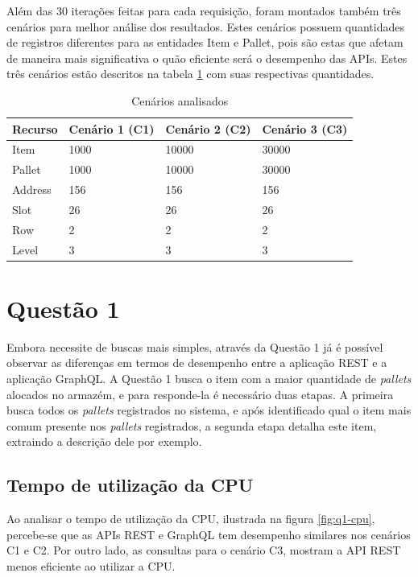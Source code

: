 Além das 30 iterações feitas para cada requisição, foram montados também três cenários para melhor análise dos resultados. Estes cenários possuem quantidades de registros diferentes para as entidades \textup{Item} e \textup{Pallet}, pois são estas que afetam de maneira mais significativa o quão eficiente será o desempenho das APIs. Estes três cenários estão descritos na tabela \ref{tab:cenarios} com suas respectivas quantidades.

\begin{table}[htbp]
    \centering
    \begin{tabular}{| l | l | l | l|}
        \hline
        \textbf{Recurso} & \textbf{Cenário 1 (C1)} & \textbf{Cenário 2 (C2)} & \textbf{Cenário 3 (C3)} \\ \hline
        Item & 1000 & 10000 & 30000 \\ \hline
        Pallet & 1000 & 10000 & 30000 \\ \hline
        Address & 156 & 156 & 156 \\ \hline
        Slot & 26 & 26 & 26 \\ \hline
        Row & 2 & 2 & 2 \\ \hline
        Level & 3 & 3 & 3 \\ \hline
    \end{tabular}
    \caption{Cenários analisados} 
    \label{tab:cenarios}
\end{table}

\section{Questão 1}

Embora necessite de buscas mais simples, através da Questão 1 já é possível observar as diferenças em termos de desempenho entre a aplicação REST e a aplicação GraphQL. A Questão 1 busca o item com a maior quantidade de \textit{pallets} alocados no armazém, e para responde-la é necessário duas etapas. A primeira busca todos os \textit{pallets} registrados no sistema, e após identificado qual o item mais comum presente nos \textit{pallets} registrados, a segunda etapa detalha este item, extraindo a descrição dele por exemplo.

\subsection{Tempo de utilização da CPU}

Ao analisar o tempo de utilização da CPU, ilustrada na figura \ref{fig:q1-cpu}, percebe-se que as APIs REST e GraphQL tem desempenho similares nos cenários C1 e C2. Por outro lado, as consultas para o cenário C3, mostram a API REST menos eficiente ao utilizar a CPU.

